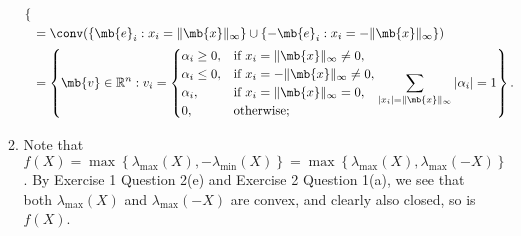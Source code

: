 \begin{exercise}[Subdifferentials]
\begin{enumerate}
\begin{solution}
\begin{enumerate}
\begin{align*}
\begin{cases}
              \end{cases} \\
                                 & =\conv (\left\{ \mb{e}_i : x_i = \|\mb{x}\|_\infty \right\} \cup \left\{ -\mb{e}_i : x_i = -\|\mb{x}\|_\infty \right\})                   \\
                                 & =
              \left\{\mb{v} \in \mathbb{R}^n : v_i =
              \begin{cases}
                \alpha_i \ge 0, & \text{if } x_i = \|\mb{x}\|_\infty \neq 0,  \\
                \alpha_i \le 0, & \text{if } x_i = -\|\mb{x}\|_\infty \neq 0, \\
                \alpha_i,       & \text{if } x_i = \|\mb{x}\|_\infty = 0,     \\
                0,              & \text{otherwise};
              \end{cases}
              \sum_{|x_i| = \|\mb{x}\|_\infty} |\alpha_i| = 1\right\}.
            \end{align*}
          \item Note that $f(X) = \max\left\{\lambda_{\max}(X), -\lambda_{\min}(X)\right\} = \max\left\{\lambda_{\max}(X), \lambda_{\max}(-X)\right\}$. By Exercise 1 Question 2(e) and Exercise 2 Question 1(a), we see that both $\lambda_{\max}(X)$ and $\lambda_{\max}(-X)$ are convex, and clearly also closed, so is $f(X)$.
            

\end{enumerate}
\end{solution}
\end{enumerate}
\end{exercise}
